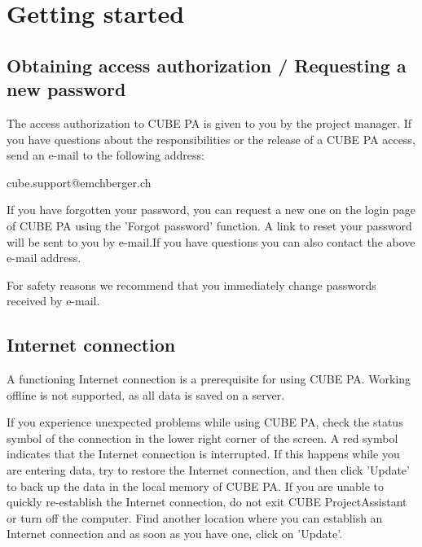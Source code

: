 

\section{Getting started}
\subsection{Obtaining access authorization / Requesting a new password}


The access authorization to CUBE PA is given to you by the project manager. If you have questions about the responsibilities or the release of a CUBE PA access, send an e-mail to the following address:

\vspace{\baselineskip}

{\color{red} cube.support@emchberger.ch}

\vspace{\baselineskip}

If you have forgotten your password, you can request a new one on the login page of CUBE PA using the 'Forgot password' function. A link to reset your password will be sent to you by e-mail.If you have questions you can also contact the above e-mail address.

\vspace{\baselineskip}

For safety reasons we recommend that you immediately change passwords received by e-mail.

\subsection{Internet connection}

A functioning Internet connection is a prerequisite for using CUBE PA. Working offline is not supported, as all data is saved on a server.

\vspace{\baselineskip}

If you experience unexpected problems while using CUBE PA, check the status symbol of the connection in the lower right corner of the screen. A red symbol indicates that the Internet connection is interrupted. If this happens while you are entering data, try to restore the Internet connection, and then click 'Update' to back up the data in the local memory of CUBE PA.
If you are unable to quickly re-establish the Internet connection, do not exit CUBE ProjectAssistant or turn off the computer. Find another location where you can establish an Internet connection and as soon as you have one, click on 'Update'.

